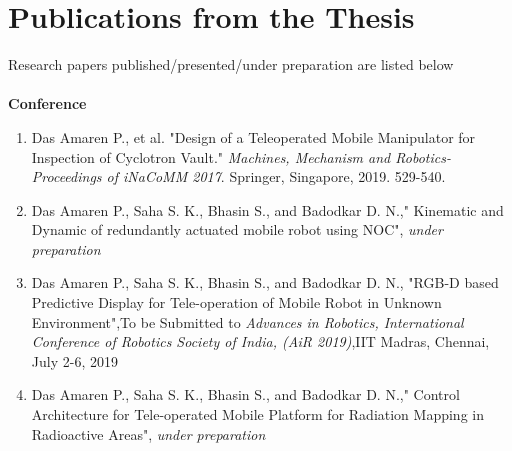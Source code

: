 \chapter*{Publications from the Thesis}
Research papers published/presented/under preparation are listed below\\
 \\
 \textbf{ Conference}
\begin{enumerate}
\item  Das Amaren P., et al. "Design of a Teleoperated Mobile Manipulator for Inspection of Cyclotron Vault."\textit{ Machines, Mechanism and Robotics-Proceedings of iNaCoMM 2017}. Springer, Singapore, 2019. 529-540.
\item  Das Amaren P., Saha S. K., Bhasin S., and Badodkar D. N.," Kinematic and Dynamic of redundantly actuated mobile robot using NOC", \textit{under preparation}

\item Das Amaren P., Saha S. K., Bhasin S., and Badodkar D. N., "RGB-D based Predictive Display for Tele-operation of Mobile Robot in Unknown Environment",To be Submitted to\textit{ Advances in Robotics, International Conference of Robotics Society of India, (AiR 2019)},IIT Madras, Chennai, July 2-6, 2019

\item  Das Amaren P., Saha S. K., Bhasin S., and Badodkar D. N.," Control Architecture for Tele-operated Mobile Platform for Radiation Mapping in Radioactive Areas", \textit{under preparation}
\end{enumerate}